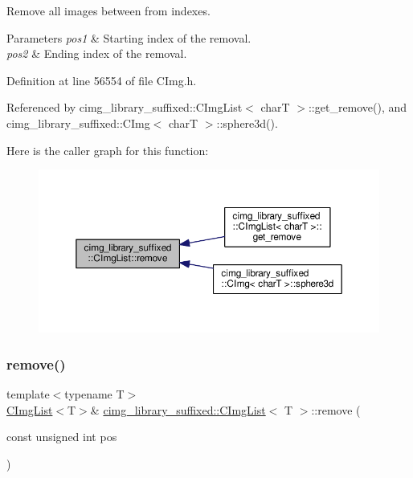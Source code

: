Remove all images between from indexes. 


\begin{DoxyParams}{Parameters}
{\em pos1} & Starting index of the removal. \\
\hline
{\em pos2} & Ending index of the removal. \\
\hline
\end{DoxyParams}


Definition at line 56554 of file C\+Img.\+h.



Referenced by cimg\+\_\+library\+\_\+suffixed\+::\+C\+Img\+List$<$ char\+T $>$\+::get\+\_\+remove(), and cimg\+\_\+library\+\_\+suffixed\+::\+C\+Img$<$ char\+T $>$\+::sphere3d().

Here is the caller graph for this function\+:
\nopagebreak
\begin{figure}[H]
\begin{center}
\leavevmode
\includegraphics[width=350pt]{d5/d7e/structcimg__library__suffixed_1_1CImgList_a5ba43383fa88dd0cbd26db1511280cc5_icgraph}
\end{center}
\end{figure}
\mbox{\label{structcimg__library__suffixed_1_1CImgList_ae06b3426c496dcd8ad456a7d7aca0117}} 
\subsubsection{\texorpdfstring{remove()}{remove()}\hspace{0.1cm}{\footnotesize\ttfamily [2/2]}}
{\footnotesize\ttfamily template$<$typename T$>$ \\
\hyperlink{structcimg__library__suffixed_1_1CImgList}{C\+Img\+List}$<$T$>$\& \hyperlink{structcimg__library__suffixed_1_1CImgList}{cimg\+\_\+library\+\_\+suffixed\+::\+C\+Img\+List}$<$ T $>$\+::remove (\begin{DoxyParamCaption}\item[{const unsigned int}]{pos }\end{DoxyParamCaption})\hspace{0.3cm}{\ttfamily [inline]}}



